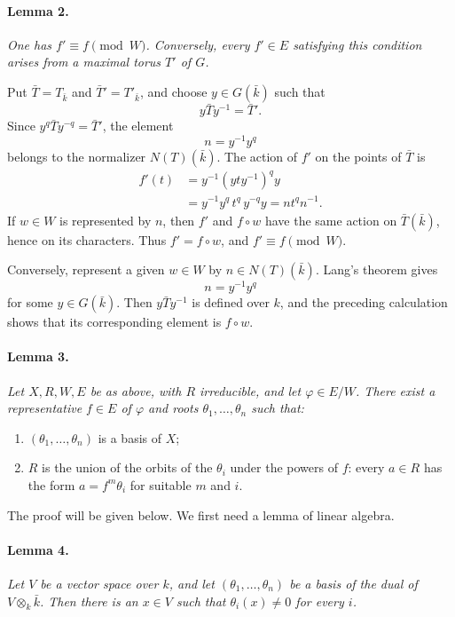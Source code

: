 
\paragraph{\textbf{Lemma 2.}}
{\itshape One has \(f'\equiv f\pmod W\). Conversely, every
\(f'\in E\) satisfying this condition arises from a maximal torus
\(T'\) of \(G\).}

Put \(\bar T=T_{\bar k}\) and \(\bar T'=T'_{\bar k}\), and choose
\(y\in G(\bar k)\) such that
\[
  y\bar T y^{-1}=\bar T'.
\]
Since \(y^q\bar T y^{-q}=\bar T'\), the element
\[
  n=y^{-1}y^q
\]
belongs to the normalizer \(N(T)(\bar k)\). The action of \(f'\)
on the points of \(\bar T\) is
\[
 \begin{aligned}
  f'(t)
    &=y^{-1}(yty^{-1})^q y\\
    &=y^{-1}y^q\,t^q\,y^{-q}y
      =nt^qn^{-1}.
 \end{aligned}
\]
If \(w\in W\) is represented by \(n\), then \(f'\) and
\(f\circ w\) have the same action on \(\bar T(\bar k)\), hence
on its characters. Thus \(f'=f\circ w\), and
\(f'\equiv f\pmod W\).

Conversely, represent a given \(w\in W\) by
\(n\in N(T)(\bar k)\). Lang's theorem gives
\[
  n=y^{-1}y^q
\]
for some \(y\in G(\bar k)\). Then
\(y\bar T y^{-1}\) is defined over \(k\), and the preceding
calculation shows that its corresponding element is
\(f\circ w\).

\paragraph{\textbf{Lemma 3.}}
{\itshape Let \(X,R,W,E\) be as above, with \(R\) irreducible,
and let \(\varphi\in E/W\). There exist a representative
\(f\in E\) of \(\varphi\) and roots
\(\theta_1,\ldots,\theta_n\) such that:
\begin{enumerate}
\item \((\theta_1,\ldots,\theta_n)\) is a basis of \(X\);
\item \(R\) is the union of the orbits of the \(\theta_i\) under
the powers of \(f\): every \(a\in R\) has the form
\(a=f^m\theta_i\) for suitable \(m\) and \(i\).
\end{enumerate}}

The proof will be given below. We first need a lemma of linear
algebra.

\paragraph{\textbf{Lemma 4.}}
{\itshape Let \(V\) be a vector space over \(k\), and let
\((\theta_1,\ldots,\theta_n)\) be a basis of the dual of
\(V\otimes_k\bar k\). Then there is an \(x\in V\) such that
\(\theta_i(x)\ne0\) for every \(i\).}

